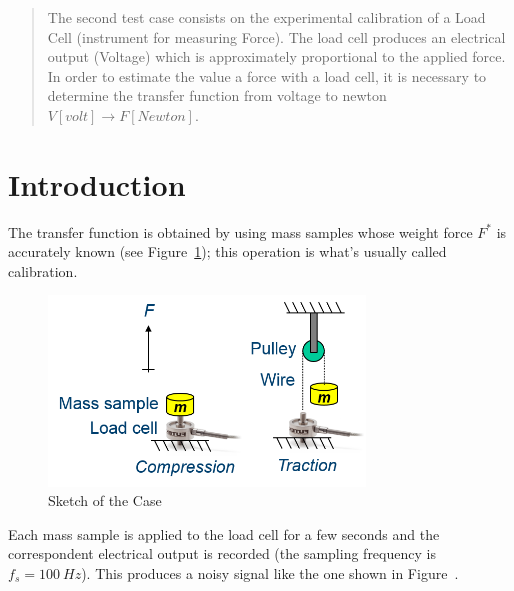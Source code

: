\documentclass[12pt]{article}
\begin{document}
\maketitle

\begin{abstract}
        The second test case consists on the experimental calibration of a Load Cell (instrument for measuring Force). The load cell produces an electrical output (Voltage) which is approximately proportional to the applied force. In order to estimate the value a force with a load cell, it is necessary to determine the transfer function from voltage to newton \( V [volt] \rightarrow F [Newton] \). \cite{FL:02}
\end{abstract}

\section{Introduction}

        The transfer function is obtained by using mass samples whose weight force \( F^* \) is accurately known (see Figure~\ref{fig:sketch}); this operation is what's usually called calibration.

        \begin{figure}[!ht]
                \includegraphics[width=0.75\textwidth]{Sketch.png}
                \centering
                \caption{Sketch of the Case}
                \label{fig:sketch}
        \end{figure}

        Each mass sample is applied to the load cell for a few seconds and the correspondent electrical output is recorded (the sampling frequency is \( f_s=100 \: H\!z \)). This produces a noisy signal like the one shown in Figure~.
\end{document}
